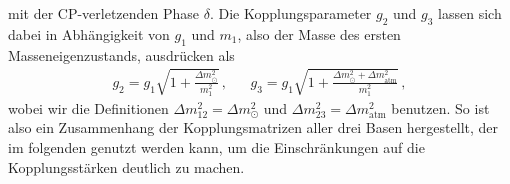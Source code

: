 mit der CP-verletzenden Phase $\delta$.
Die Kopplungsparameter $g_2$ und $g_3$ lassen sich dabei in Abhängigkeit von $g_1$ und $m_1$, also der Masse des ersten Masseneigenzustands, ausdrücken als
\begin{align}
    g_2 = g_1 \sqrt{1 + \frac{\Delta m^2_\odot}{m^2_1}}\,, && g_3 = g_1 \sqrt{1 + \frac{\Delta m^2_\odot + \Delta m^2_\text{atm}}{m^2_1}} \,,
    \label{eq:g2g3}
\end{align}
wobei wir die Definitionen $\Delta m^2_{1 2} = \Delta m^2_\odot$ und $\Delta m^2_{23} = \Delta m^2_\text{atm}$ benutzen.
So ist also ein Zusammenhang der Kopplungsmatrizen aller drei Basen hergestellt, der im folgenden genutzt werden kann, um die Einschränkungen auf die Kopplungsstärken deutlich zu machen.
















